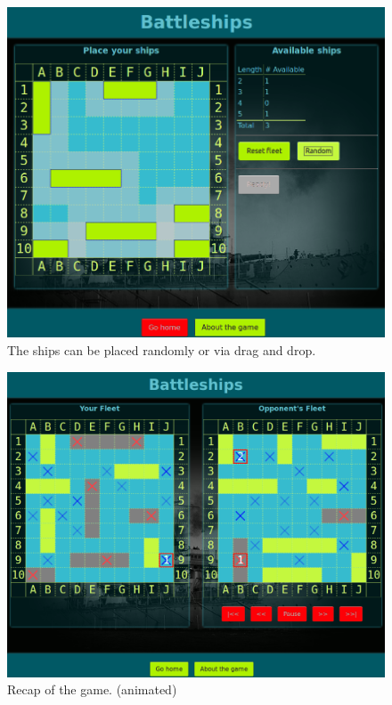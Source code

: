 \documentclass[a4paper]{easychair}
\begin{document}
\begin{figure}
 \centering
  \includegraphics[scale=0.25]{place.png}
 \caption{The ships can be placed randomly or via drag and drop.}
\end{figure}

\begin{figure}
 \centering
  \includegraphics[scale=0.25]{replay.png}
 \caption{Recap of the game. (animated)}
\end{figure}

\end{document}
